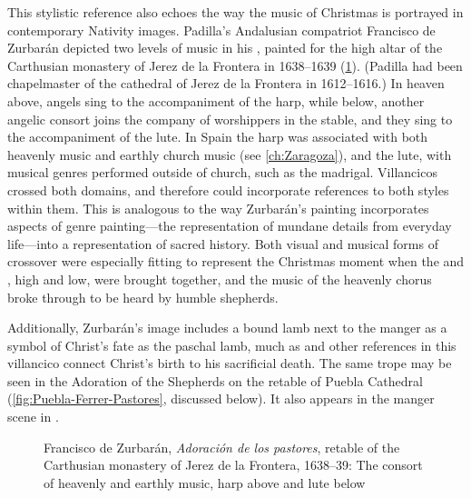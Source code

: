 This stylistic reference also echoes the way the music of Christmas is portrayed
in contemporary Nativity images.
Padilla's Andalusian compatriot Francisco de Zurbarán depicted two levels of
music in his , painted for the high altar of
the Carthusian monastery of Jerez de la Frontera in 1638--1639
(\cref{fig:Zurbaran-Jerez-Adoracion}).
(Padilla had been chapelmaster of the cathedral of Jerez de la Frontera in
1612--1616.)%
    \Autocite{Gembero:Padilla}
In heaven above, angels sing to the accompaniment of the harp, while below,
another angelic consort joins the company of worshippers in the stable, and they
sing to the accompaniment of the lute.
In Spain the harp was associated with both heavenly music and earthly church
music (see \cref{ch:Zaragoza}), and the lute, with musical genres
performed outside of church, such as the madrigal.
Villancicos crossed both domains, and therefore could incorporate references to
both styles within them.
This is analogous to the way Zurbarán's painting incorporates aspects of genre
painting---the representation of mundane details from everyday life---into a
representation of sacred history.%
    \Autocites[31]{Sanchez:Zurbaran}{Cherry:Bodegon}{Haraszti-Takacs:Genre}
Both visual and musical forms of crossover were especially fitting to represent
the Christmas moment when the  and , high and low,
were brought together, and the music of the heavenly chorus broke through to be
heard by humble shepherds.%
\begin{Footnote}
    Additionally, Zurbarán's image includes a bound lamb next to the manger as a
    symbol of Christ's fate as the paschal lamb, much as  and other references in this villancico connect Christ's birth
    to his sacrificial death.
    The same trope may be seen in the Adoration of the Shepherds on the retable
    of Puebla Cathedral (\cref{fig:Puebla-Ferrer-Pastores}, discussed below).
    It also appears in the manger scene in
    \autocite[168]{Catholic:Breviarium1631}.
\end{Footnote}

\begin{figure}
    \caption{Francisco de Zurbarán, \emph{Adoración de los pastores}, retable of
    the Carthusian monastery of Jerez de la Frontera, 1638--39: The consort of
    heavenly and earthly music, harp above and lute below}

    \label{fig:Zurbaran-Jerez-Adoracion}

\end{figure}

